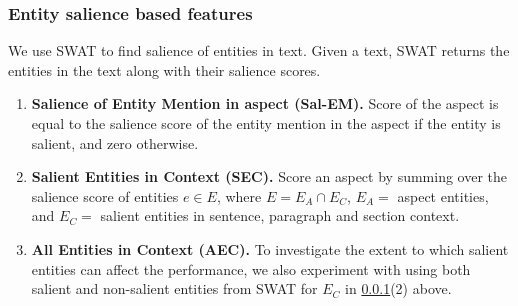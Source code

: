 \subsubsection{Entity salience based features}
\label{subsubsec:Entity salience based features}
We use SWAT \cite{swat} to find salience of entities in text. Given a text, SWAT returns the entities in the text along with their salience scores.
\begin{enumerate}
    \item \textbf{Salience of Entity Mention in aspect (Sal-EM).} Score of the aspect is equal to the salience score of the entity mention in the aspect if the entity is salient, and zero otherwise.
    
    \item \textbf{Salient Entities in Context (SEC).} Score an aspect by summing over the salience score of entities $e \in E$, where $E = E_A \cap E_C$, $E_A =$ aspect entities, and $E_C =$ salient entities in sentence, paragraph and section context.
    
    
    \item \textbf{All Entities in Context (AEC).} 
    To investigate the extent to which salient entities can affect the performance, we also experiment with using both salient and non-salient entities from SWAT for $E_C$ in \ref{subsubsec:Entity salience based features}(2) above. 
\end{enumerate}


